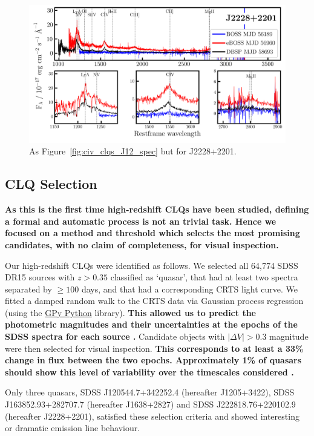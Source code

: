 \documentclass[fleqn,usenatbib]{mnras}
\begin{document}
\begin{figure}
  \centering
  \includegraphics[width=16.7cm, trim=0.3cm 0.0cm  0.30cm 0.1cm, clip]
  {figures/J2228+2201_landscape_spectra.png}
  \vspace{-12pt}
  \caption[]{As Figure~\ref{fig:civ_clqs_J12_spec} but for   J2228+2201.}
  \label{fig:civ_clqs_J22_spec}
\end{figure}

\subsection{CLQ Selection}
{\bf As this is the first time high-redshift CLQs have been studied,
defining a formal and automatic process is not an trivial task.  Hence
we focused on a method and threshold which selects the most promising
candidates, with no claim of completeness, for visual inspection.}

Our high-redshift CLQs were identified as follows.  We selected all
64,774 SDSS DR15 sources with $z > 0.35$ classified as `quasar', that
had at least two spectra separated by $\geq 100$ days, and that had a
corresponding CRTS light curve. We fitted a damped random walk to the
CRTS data via Gaussian process regression (using the
\href{https://gpy.readthedocs.io/en/deploy/}{GPy Python} library).
{\bf This allowed us to predict the photometric magnitudes and their
uncertainties at the epochs of the SDSS spectra for each source
\citep[see][]{Rasmussen_Williams2006}.} Candidate objects with
$|\Delta V| > 0.3$ magnitude were then selected for visual
inspection. {\bf This corresponds to at least a 33\% change in flux
between the two epochs. Approximately 1\% of quasars should show this
level of variability over the timescales considered
\citep{Graham2017}.}

Only three quasars, SDSS
J120544.7+342252.4 (hereafter J1205+3422), SDSS J163852.93+282707.7
(hereafter J1638+2827) and SDSS J222818.76+220102.9 (hereafter
J2228+2201), satisfied these selection criteria and showed interesting
or dramatic emission line behaviour.
\end{document}
